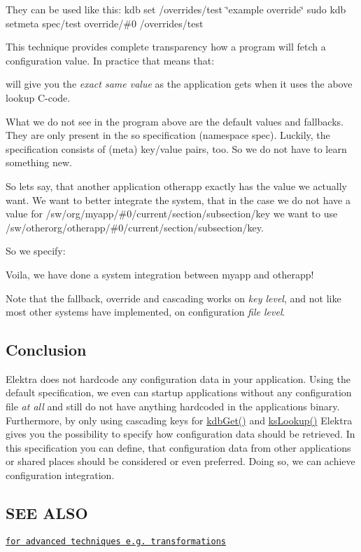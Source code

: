They can be used like this\+: {\ttfamily kdb set /overrides/test \char`\"{}example override\char`\"{}} {\ttfamily sudo kdb setmeta spec/test override/\#0 /overrides/test}

This technique provides complete transparency how a program will fetch a configuration value. In practice that means that\+: 


will give you the {\itshape exact same value} as the application gets when it uses the above lookup C-\/code.

What we do not see in the program above are the default values and fallbacks. They are only present in the so specification (namespace {\ttfamily spec}). Luckily, the specification consists of (meta) key/value pairs, too. So we do not have to learn something new.

So lets say, that another application {\ttfamily otherapp} exactly has the value we actually want. We want to better integrate the system, that in the case we do not have a value for {\ttfamily /sw/org/myapp/\#0/current/section/subsection/key} we want to use {\ttfamily /sw/otherorg/otherapp/\#0/current/section/subsection/key}.

So we specify\+: 


Voila, we have done a system integration between {\ttfamily myapp} and {\ttfamily otherapp}!

Note that the fallback, override and cascading works on {\itshape key level}, and not like most other systems have implemented, on configuration {\itshape file level}.

\subsection*{Conclusion}

Elektra does not hardcode any configuration data in your application. Using the {\ttfamily default} specification, we even can startup applications without any configuration file {\itshape at all} and still do not have anything hardcoded in the applications binary. Furthermore, by only using cascading keys for {\ttfamily \hyperlink{group__kdb_ga28e385fd9cb7ccfe0b2f1ed2f62453a1}{kdb\+Get()}} and {\ttfamily \hyperlink{group__keyset_gaa34fc43a081e6b01e4120daa6c112004}{ks\+Lookup()}} Elektra gives you the possibility to specify how configuration data should be retrieved. In this specification you can define, that configuration data from other applications or shared places should be considered or even preferred. Doing so, we can achieve configuration integration.

\subsection*{S\+E\+E A\+L\+S\+O}


\begin{DoxyItemize}
\item \href{http://www.libelektra.org/ftp/papers/kps2015sharing.pdf}{\tt for advanced techniques e.\+g. transformations} 
\end{DoxyItemize}